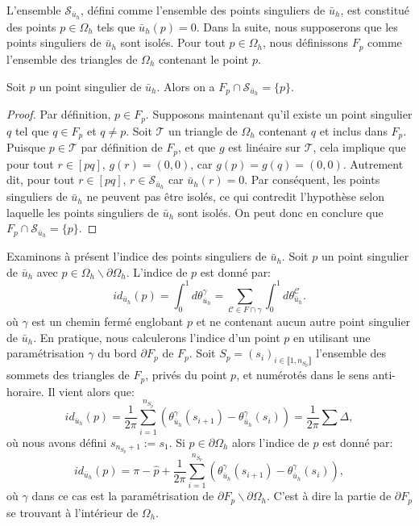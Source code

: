 L'ensemble $\mathcal{S}_{\bar{u}_h}$, défini comme l'ensemble des points singuliers de $\bar{u}_h$, est constitué des points $p \in \Omega_h$ tels que $\bar{u}_h(p) = 0$. \color{red} Dans la suite, nous supposerons que les points singuliers de $\bar{u}_h$ sont isolés. \color{black} Pour tout $p\in\Omega_h$, nous définissons $F_p$ comme l'ensemble des triangles de $\Omega_h$ contenant le point $p$.
\begin{lemma}
    Soit $p$ un point singulier de $\bar{u}_h$. Alors on a $F_p\cap\mathcal{S}_{\bar{u}_h}=\{p\}$.
\end{lemma}
\begin{proof}
    Par définition, $p\in F_p$. Supposons maintenant qu'il existe un point singulier $q$ tel que $q\in F_p$ et $q\neq p$. Soit $\mathcal{T}$ un triangle de $\Omega_h$ contenant $q$ et inclus dans $F_p$. Puisque $p\in\mathcal{T}$ par définition de $F_p$, et que $g$ est linéaire sur $\mathcal{T}$, cela implique que pour tout $r\in[pq]$, $g(r)=(0, 0)$, car $g(p)=g(q)=(0,0)$. Autrement dit, pour tout $r\in[pq]$, $r\in\mathcal{S}_{\bar{u}_h}$ car $\bar{u}_h(r)=0$. Par conséquent, les points singuliers de $\bar{u}_h$ ne peuvent pas être isolés, ce qui contredit l'hypothèse selon laquelle les points singuliers de $\bar{u}_h$ sont isolés. On peut donc en conclure que $F_p\cap\mathcal{S}_{\bar{u}_h}=\{p\}$.
\end{proof}

Examinons à présent l'indice des points singuliers de $\bar{u}_h$. Soit $p$ un point singulier de $\bar{u}_h$ avec $p\in\Omega_h\backslash\partial\Omega_h$. L'indice de $p$ est donné par:
$$
id_{\bar{u}_h}(p)=\int_0^1 d\theta^\gamma_{\bar{u}_h}=\sum_{\mathcal{C}\in F\cap\gamma}\int_0^1 d\theta^{\mathcal{C}}_{\bar{u}_h}.
$$
où $\gamma$ est un chemin fermé englobant $p$ et ne contenant aucun autre point singulier de $\bar{u}_h$. En pratique, nous calculerons l'indice d'un point $p$ en utilisant une paramétrisation $\gamma$ du bord $\partial F_p$ de $F_p$. Soit $S_p=(s_i)_{i\in\llbracket 1, n_{S_p}\rrbracket}$ l'ensemble des sommets des triangles de $F_p$, privés du point $p$, et numérotés dans le sens anti-horaire.  Il vient alors que:
\begin{equation}
    id_{\bar{u}_h}(p)=\displaystyle\frac{1}{2\pi}\displaystyle\sum_{i=1}^{n_{S_p}}\left(\theta^\gamma_{\bar{u}_h}(s_{i+1})-\theta^\gamma_{\bar{u}_h}(s_i)\right)=\displaystyle\frac{1}{2\pi}\sum\Delta,
\end{equation}
où  nous avons défini $s_{n_{S_p}+1}:=s_1$.
Si $p\in\partial\Omega_h$ alors l'indice de $p$ est donné par:
\begin{equation}
    id_{\bar{u}_h}(p)=\pi-\widehat{p}+\displaystyle\frac{1}{2\pi}\displaystyle\sum_{i=1}^{n_{S_p}}\left(\theta^\gamma_{\bar{u}_h}(s_{i+1})-\theta^\gamma_{\bar{u}_h}(s_i)\right),
\end{equation}
où $\gamma$ dans ce cas est la paramétrisation de $\partial F_p\backslash\partial\Omega_h$. C'est à dire la partie de $\partial F_p$ se trouvant à l'intérieur de $\Omega_h$.

